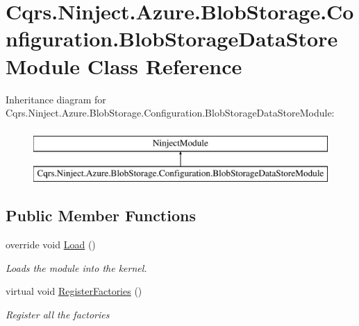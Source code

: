 \hypertarget{classCqrs_1_1Ninject_1_1Azure_1_1BlobStorage_1_1Configuration_1_1BlobStorageDataStoreModule}{}\section{Cqrs.\+Ninject.\+Azure.\+Blob\+Storage.\+Configuration.\+Blob\+Storage\+Data\+Store\+Module Class Reference}
\label{classCqrs_1_1Ninject_1_1Azure_1_1BlobStorage_1_1Configuration_1_1BlobStorageDataStoreModule}
Inheritance diagram for Cqrs.\+Ninject.\+Azure.\+Blob\+Storage.\+Configuration.\+Blob\+Storage\+Data\+Store\+Module\+:\begin{figure}[H]
\begin{center}
\leavevmode
\includegraphics[height=2.000000cm]{classCqrs_1_1Ninject_1_1Azure_1_1BlobStorage_1_1Configuration_1_1BlobStorageDataStoreModule}
\end{center}
\end{figure}
\subsection*{Public Member Functions}
\begin{DoxyCompactItemize}
\item 
override void \hyperlink{classCqrs_1_1Ninject_1_1Azure_1_1BlobStorage_1_1Configuration_1_1BlobStorageDataStoreModule_a6d22aa3f1093d4892b298dc770430a89_a6d22aa3f1093d4892b298dc770430a89}{Load} ()
\begin{DoxyCompactList}\small\item\em Loads the module into the kernel. \end{DoxyCompactList}\item 
virtual void \hyperlink{classCqrs_1_1Ninject_1_1Azure_1_1BlobStorage_1_1Configuration_1_1BlobStorageDataStoreModule_a275c2a6bb6004ad0a5119041d64097be_a275c2a6bb6004ad0a5119041d64097be}{Register\+Factories} ()
\begin{DoxyCompactList}\small\item\em Register all the factories \end{DoxyCompactList}\end{DoxyCompactItemize}


